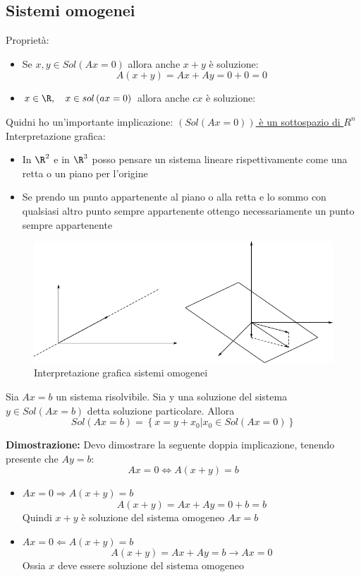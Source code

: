 \subsection{Sistemi omogenei}
Proprietà:
\begin{itemize}
	\item Se $x,y \in  Sol\left( Ax=0 \right) $ allora anche $x+y$ è soluzione:
	      \[
		      A\left( x+y \right)  = Ax + Ay = 0 + 0 = 0
	      \]
	\item $x \in  \R, \quad  x \in  sol \left(  ax = 0 \right) $ allora anche $cx$ è soluzione:
\end{itemize}
Quidni ho un'importante implicazione:  \underline{ $ \left( Sol\left( Ax=0 \right)  \right) $ è un sottospazio di $R^{n}$}
\vskip3mm
Interpretazione grafica:
\begin{itemize}
	\item In $\R^{2}$ e in $\R^{3}$ posso pensare un sistema lineare rispettivamente come una retta o un piano per l'origine
	\item Se prendo un punto appartenente al piano o alla retta e lo sommo con qualsiasi altro punto sempre appartenente ottengo necessariamente un punto sempre appartenente
\end{itemize}
\begin{figure}[H]
	\centering
	\includegraphics{Images/Sistemi omogenei.pdf}
	\caption{Interpretazione grafica sistemi omogenei}
\end{figure}

\begin{teorema}
	Sia $Ax = b$ un sistema risolvibile. Sia y una soluzione del sistema $ y \in  Sol \left( Ax=b \right) $ detta soluzione particolare. Allora \[
		Sol\left( Ax =b \right)  = \left\{ x = y + x_0 | x_0 \in  Sol\left( Ax=0 \right)  \right\}
	\]
\end{teorema}

\textbf{Dimostrazione:}
Devo dimostrare la seguente doppia implicazione, tenendo presente che $ Ay=b $:
\[
	Ax =0 \Leftrightarrow A \left( x + y \right) = b
\]
\begin{itemize}
	\item $ Ax =0 \Rightarrow A\left( x+y \right) =b $
	      \[
		      A\left( x+y \right) = Ax+Ay =  0+b = b
	      \]
	      Quindi $x+y$ è soluzione del sistema omogeneo $Ax=b$
	\item $ Ax =0 \Leftarrow A\left( x+y \right) =b $
	      \[
		      A\left( x+y \right) = Ax + Ay = b \rightarrow Ax = 0
	      \]
	      Ossia $ x $ deve essere soluzione del sistema omogeneo
\end{itemize}

